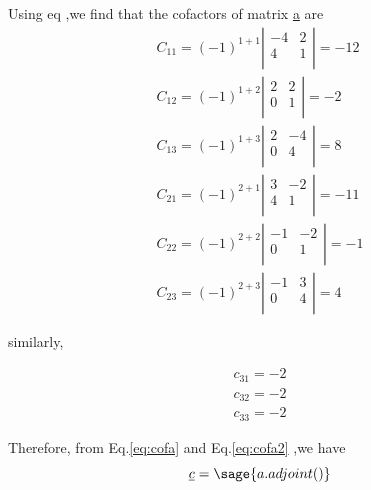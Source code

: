 \documentclass[12pt]{report}
\newcommand{\eref}[1]{
	Eq.\ref{#1}
}
\begin{document}
Using eq ,we find that the cofactors of matrix \underline{a} are 
\begin{eqnarray}
	  C_{11} = (-1)^{1+1} \left|\begin{array}{rr} -4 &  2 \\4 & 1\\ 
	\end{array}\right| = -12 \nonumber 
	\\C_{12} = (-1)^{1+2} \left|\begin{array}{rr}  2 &  2 \\0 & 1\\ 
	\end{array}\right| =  -2 \nonumber 
	\\C_{13} = (-1)^{1+3} \left|\begin{array}{rr}  2 & -4 \\0 & 4\\ 
	\end{array}\right| =   8 \nonumber 
	\\C_{21} = (-1)^{2+1} \left|\begin{array}{rr}  3 & -2 \\4 & 1\\ 
	\end{array}\right| = -11 \nonumber 
	\\C_{22} = (-1)^{2+2} \left|\begin{array}{rr} -1 & -2 \\0 & 1\\
	 \end{array}\right| =  -1 \nonumber 
	\\C_{23} = (-1)^{2+3} \left|\begin{array}{rr} -1 &  3 \\0 & 4\\ 
	\end{array}\right| =   4 
\label{eq:cofa}
\end{eqnarray} 
 
similarly,

\begin{eqnarray} 
	c_{31} = -2 \nonumber \\ 
	c_{32} = -2 \nonumber \\
	c_{33} = -2 
	\label{eq:cofa2}
\end{eqnarray}

Therefore, from \eref{eq:cofa} and \eref{eq:cofa2} ,we have 
\begin{equation} 
	\underline{c} = \sage{a.adjoint()}
\end{equation}
\end{document}
